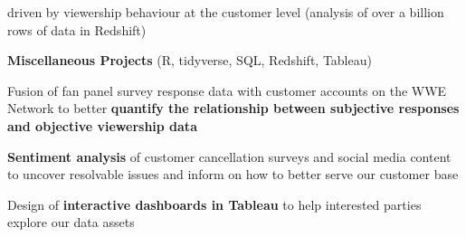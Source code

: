 \begin{itemize*}
    driven by viewership behaviour at the customer level (analysis of
    over a billion rows of data in Redshift)
  \item\leftandright
    {\textbf{Miscellaneous Projects}}
    {\small{(R, tidyverse, SQL, Redshift, Tableau)}}
    \begin{itemize*}
      \item Fusion of fan panel survey response data with customer accounts on the
        WWE Network to better \textbf{quantify the relationship between
        subjective responses and objective viewership data}
      \item \textbf{Sentiment analysis} of customer cancellation surveys
        and social media content to uncover resolvable issues and inform on
        how to better serve our customer base
      \item Design of \textbf{interactive dashboards in Tableau} to help interested
        parties explore our data assets
    \end{itemize*}
\end{itemize*}


